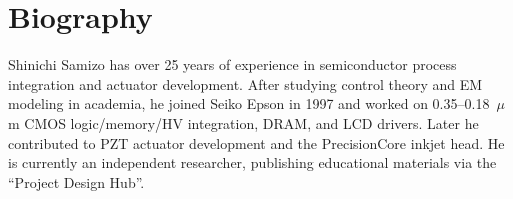 \documentclass[conference]{IEEEtran}
\begin{document}
\section*{Biography}
Shinichi Samizo has over 25 years of experience in semiconductor process integration and actuator development. After studying control theory and EM modeling in academia, he joined Seiko Epson in 1997 and worked on 0.35–0.18~$\mu$m CMOS logic/memory/HV integration, DRAM, and LCD drivers. Later he contributed to PZT actuator development and the PrecisionCore inkjet head. He is currently an independent researcher, publishing educational materials via the ``Project Design Hub''.
\end{document}
